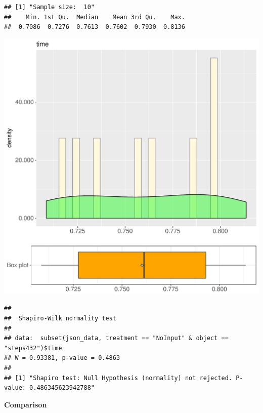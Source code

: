 \documentclass{article}\usepackage[]{graphicx}\usepackage[]{color}
\makeatletter
\def\maxwidth{ %
  \ifdim\Gin@nat@width>\linewidth
    \linewidth
  \else
    \Gin@nat@width
  \fi
}
\newenvironment{kframe}{%
 \def\at@end@of@kframe{}%
 \ifinner\ifhmode%
  \def\at@end@of@kframe{\end{minipage}}%
  \begin{minipage}{\columnwidth}%
 \fi\fi%
 \def\FrameCommand##1{\hskip\@totalleftmargin \hskip-\fboxsep
 \colorbox{shadecolor}{##1}\hskip-\fboxsep
     \hskip-\linewidth \hskip-\@totalleftmargin \hskip\columnwidth}%
 \MakeFramed {\advance\hsize-\width
   \@totalleftmargin\z@ \linewidth\hsize
   \@setminipage}}%
 {\par\unskip\endMakeFramed%
 \at@end@of@kframe}
\newenvironment{knitrout}{}{} %
\makeatother
\begin{document}
\begin{knitrout}
\color{fgcolor}\begin{kframe}
\begin{verbatim}
## [1] "Sample size:  10"
##    Min. 1st Qu.  Median    Mean 3rd Qu.    Max. 
##  0.7086  0.7276  0.7613  0.7602  0.7930  0.8136
\end{verbatim}
\end{kframe}
\includegraphics[width=\maxwidth]{figure/RH4_NoInput_steps432-1} 
\begin{kframe}\begin{verbatim}
## 
## 	Shapiro-Wilk normality test
## 
## data:  subset(json_data, treatment == "NoInput" & object == "steps432")$time
## W = 0.93381, p-value = 0.4863
## 
## [1] "Shapiro test: Null Hypothesis (normality) not rejected. P-value: 0.486345623942788"
\end{verbatim}
\end{kframe}
\end{knitrout}
  
 \textbf{Comparison}
  
\end{document}
